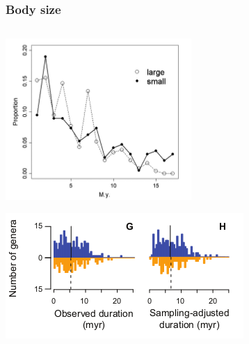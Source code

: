 \documentclass{beamer}
\begin{document}
\begin{frame}
  \frametitle{Body size}

  \begin{columns}
    \begin{column}{0.5\textwidth}
      \includegraphics[height=0.4\textheight, width=\textwidth, keepaspectratio=true]{figure/liowmam}

      \tiny{}

      \includegraphics[height=0.4\textheight, width=\textwidth, keepaspectratio=true]{figure/susumu}


\end{column}
\end{columns}
\end{frame}
\end{document}
